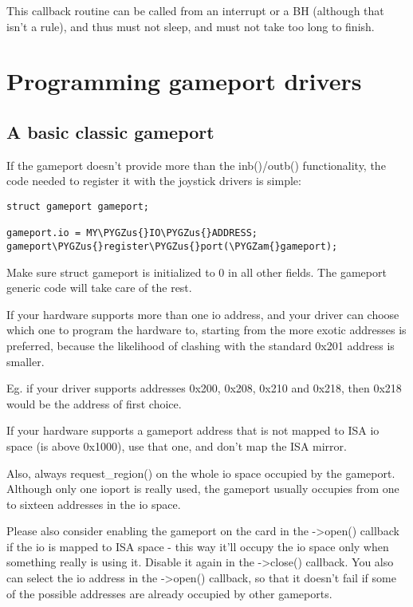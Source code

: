 \documentclass[a4paper,8pt,english]{sphinxmanual}
\def\PYGZus{\char`\_}
\def\PYGZam{\char`\&}
\begin{document}
This callback routine can be called from an interrupt or a BH (although that
isn't a rule), and thus must not sleep, and must not take too long to finish.


\section{Programming gameport drivers}
\label{input/gameport-programming:programming-gameport-drivers}\label{input/gameport-programming::doc}

\subsection{A basic classic gameport}
\label{input/gameport-programming:a-basic-classic-gameport}
If the gameport doesn't provide more than the inb()/outb() functionality,
the code needed to register it with the joystick drivers is simple:

\begin{Verbatim}[commandchars=\\\{\}]
struct gameport gameport;

gameport.io = MY\PYGZus{}IO\PYGZus{}ADDRESS;
gameport\PYGZus{}register\PYGZus{}port(\PYGZam{}gameport);
\end{Verbatim}

Make sure struct gameport is initialized to 0 in all other fields. The
gameport generic code will take care of the rest.

If your hardware supports more than one io address, and your driver can
choose which one to program the hardware to, starting from the more exotic
addresses is preferred, because the likelihood of clashing with the standard
0x201 address is smaller.

Eg. if your driver supports addresses 0x200, 0x208, 0x210 and 0x218, then
0x218 would be the address of first choice.

If your hardware supports a gameport address that is not mapped to ISA io
space (is above 0x1000), use that one, and don't map the ISA mirror.

Also, always request\_region() on the whole io space occupied by the
gameport. Although only one ioport is really used, the gameport usually
occupies from one to sixteen addresses in the io space.

Please also consider enabling the gameport on the card in the -\textgreater{}open()
callback if the io is mapped to ISA space - this way it'll occupy the io
space only when something really is using it. Disable it again in the
-\textgreater{}close() callback. You also can select the io address in the -\textgreater{}open()
callback, so that it doesn't fail if some of the possible addresses are
already occupied by other gameports.
\end{document}
